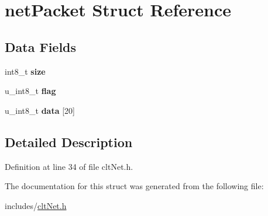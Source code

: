 \hypertarget{structnet_packet}{}\section{net\+Packet Struct Reference}
\label{structnet_packet}
\subsection*{Data Fields}
\begin{DoxyCompactItemize}
\item 
\mbox{\label{structnet_packet_a175de41b73096984ed32e887e5df63e7}} 
int8\+\_\+t {\bfseries size}
\item 
\mbox{\label{structnet_packet_acfe36f8cabae4902ccb7605df9ad0f8d}} 
u\+\_\+int8\+\_\+t {\bfseries flag}
\item 
\mbox{\label{structnet_packet_a7127c16b9b3b7f75d2dda2420d88c48f}} 
u\+\_\+int8\+\_\+t {\bfseries data} \mbox{[}20\mbox{]}
\end{DoxyCompactItemize}


\subsection{Detailed Description}


Definition at line 34 of file clt\+Net.\+h.



The documentation for this struct was generated from the following file\+:\begin{DoxyCompactItemize}
\item 
includes/\hyperlink{clt_net_8h}{clt\+Net.\+h}\end{DoxyCompactItemize}
